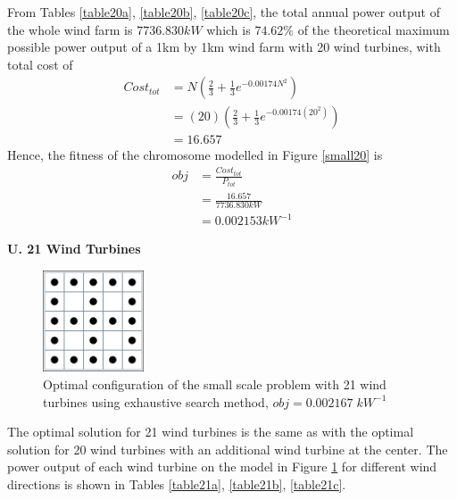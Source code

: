         From Tables \ref{table20a}, \ref{table20b}, \ref{table20c}, the total annual power output of the whole wind farm is $7736.830kW$ which is $74.62\%$ of the theoretical maximum possible power output of a 1km by 1km wind farm with 20 wind turbines, with total cost of
        \begin{align*}
            Cost_{tot}
            &= N\left(\frac{2}{3} + \frac{1}{3}e^{-0.00174N^2}\right) \\
            &= \left(20\right)\left(\frac{2}{3} + \frac{1}{3}e^{-0.00174\left(20^2\right)}\right) \\
            &=16.657
        \end{align*}
        Hence, the fitness of the chromosome modelled in Figure \ref{small20} is
        \begin{align*}
            obj
            &=\frac{Cost_{tot}}{P_{tot}} \\
            &=\frac{16.657}{7736.830kW} \\
            &=0.002153kW^{-1}
        \end{align*}
        
    \textbf{U. 21 Wind Turbines}
        \begin{figure}[H]
            \centering
            \includegraphics[width=3cm]{Figures/Chromosomes/21.png}
            \caption{Optimal configuration of the small scale problem with 21 wind turbines using exhaustive search method, $obj=0.002167\;kW^{-1}$}
            \label{small21}
        \end{figure}
        
        The optimal solution for 21 wind turbines is the same as with the optimal solution for 20 wind turbines with an additional wind turbine at the center. The power output of each wind turbine on the model in Figure \ref{small21} for different wind directions is shown in Tables \ref{table21a}, \ref{table21b}, \ref{table21c}.
        
